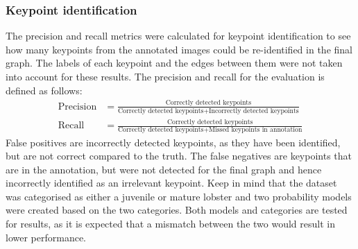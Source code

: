 \subsubsection{Keypoint identification}
The precision and recall metrics were calculated for keypoint identification to see how many keypoints from the annotated images could be re-identified in the final graph. The labels of each keypoint and the edges between them were not taken into account for these results. The precision and recall for the evaluation is defined as follows:
\begin{align}
\text{Precision} &= \frac{\text{Correctly detected keypoints}}{\text{Correctly detected keypoints} + \text{Incorrectly detected keypoints}} 
\\[10pt]
\text{Recall} &= \frac{\text{Correctly detected keypoints}}{\text{Correctly detected keypoints} + \text{Missed keypoints in annotation}}
\end{align}
False positives are incorrectly detected keypoints, as they have been identified, but are not correct compared to the truth. The false negatives are keypoints that are in the annotation, but were not detected for the final graph and hence incorrectly identified as an irrelevant keypoint. Keep in mind that the dataset was categorised as either a juvenile or mature lobster and two probability models were created based on the two categories. Both models and categories are tested for results, as it is expected that a mismatch between the two would result in lower performance.
\newcommand{\pridentplot}[5]{
\addplot+[mark=none, fill opacity=0.2, 
	discard if not={Method}{#1}, 
	discard if not={Model}{#2}, 
	discard if not={Category}{#3},
	discard if not={HistThreshold}{#4}
] table [x=Recall, y=Precision, col sep=comma] {\resultspath/kp-identification.csv};
\addlegendentry{#5}
}
\newcommand{\pridentgraph}[3]{
\begin{tikzpicture}[scale=0.8]
\begin{axis}[
	title = {\textbf{Histogram threshold of #2}},
	legend pos=south east,
	enlargelimits=true,
	xlabel={Recall},
	xmin=0,xmax=1,
	ylabel={Precision},
	ymin=0,ymax=1
]

\pridentplot{graph}{#1}{mature}{#2}{Graph method, mature lobsters}
\pridentplot{model}{#1}{mature}{#2}{Label method, mature lobsters}
\pridentplot{graph}{#1}{juvenile}{#2}{Graph method, juvenile lobsters}
\pridentplot{model}{#1}{juvenile}{#2}{Label method, juvenile lobsters}

\end{axis}
\end{tikzpicture}
}


